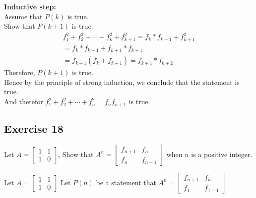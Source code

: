 \documentclass[12pt]{article}
\begin{document}
    \textbf{Inductive step:}\\
    Assume that $P(k)$  is true.\\
    Show that $P(k+1)$ is true:
    \begin{equation}
        \begin{split}
              f_{1}^2 + f_{2}^2 + \cdots + f_k^2 + f_{k+1}^2 = f_k * f_{k+1} + f_{k+1}^2\\
            = f_k * f_{k+1} + f_{k+1} * f_{k+1}\\
            = f_{k+1} (f_k+f_{k+1})
            =f_{k+1} * f_{k+2}
        \end{split}
    \end{equation}
    Therefore, $P(k+1)$ is true. \\
    Hence by the principle of strong induction, we conclude that the statement is true. \\
    And therefor $f_1^2 +f_2^2 +\cdots+f_n^2 =f_nf_{n+1}$ is true.

    \subsection{Exercise 18}
    Let 
    $ A =
    \begin{bmatrix}
        1 & 1 \\
        1 & 0  
    \end{bmatrix}
    $,
    Show that 
    $ A^n = \begin{bmatrix}
                    f_{n+1} & f_n\\
                    f_n & f_{n-1}
                    \end{bmatrix}
    $   when $n$ is a positive integer.
    
    Let $A=\begin{bmatrix}
    1&1\\
    1&0
    \end{bmatrix}$
    Let $P(n)$ be a statement that $A^n=\begin{bmatrix}
        f_{n+1}&f_{n}\\
        f_{1}&f_{1-1}
    \end{bmatrix}$
    
\end{document}
